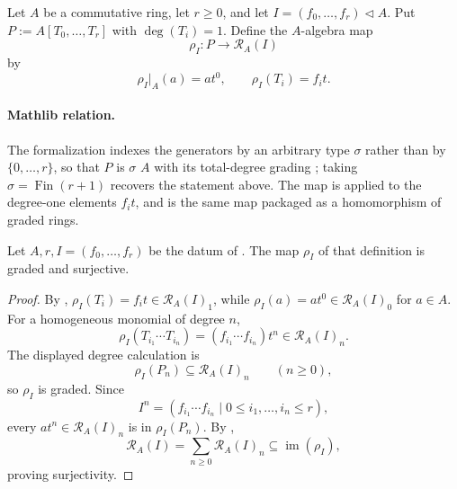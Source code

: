\begin{definition}
  \label{def:nagata-rees-polynomial-map}
  \leanok

  Let $A$ be a commutative ring, let $r\geq0$, and let
  $I=(f_0,\ldots,f_r)\triangleleft A$.  Put
  $P:=A[T_0,\ldots,T_r]$ with
  $\deg(T_i)=1$.  Define the $A$-algebra map
  \[
    \rho_I\colon P\longrightarrow\mathcal R_A(I)
  \]
  by
  \[
    \rho_I|_A(a)=at^0,\qquad \rho_I(T_i)=f_it.
  \]

  \paragraph{Mathlib relation.}
  The formalization indexes the generators by an arbitrary type $\sigma$ rather
  than by $\{0,\ldots,r\}$, so that $P$ is
  \texttt{} $\sigma$ $A$ with its total-degree grading
  \texttt{}; taking
  $\sigma=\operatorname{Fin}(r+1)$ recovers the statement above.  The map is
  \texttt{} applied to the degree-one elements
  $f_it$, and \texttt{} is the same map
  packaged as a homomorphism of graded rings.
\end{definition}

\begin{lemma}
  \label{lemma:nagata-rees-polynomial-surjection}
  \leanok

  Let $A,r,I=(f_0,\ldots,f_r)$ be the datum of
  .  The map $\rho_I$ of that
  definition is graded and surjective.
\end{lemma}

\begin{proof}
  \leanok
  By ,
  $\rho_I(T_i)=f_it\in\mathcal R_A(I)_1$, while
  $\rho_I(a)=at^0\in\mathcal R_A(I)_0$ for $a\in A$.  For a homogeneous
  monomial of degree $n$,
  \[
    \rho_I(T_{i_1}\cdots T_{i_n})
      =(f_{i_1}\cdots f_{i_n})t^n\in\mathcal R_A(I)_n.
  \]
  The displayed degree calculation is
  \[
    \rho_I(P_n)\subseteq\mathcal R_A(I)_n\qquad(n\geq0),
  \]
  so $\rho_I$ is graded.  Since
  \[
    I^n=(f_{i_1}\cdots f_{i_n}\mid
      0\le i_1,\ldots,i_n\le r),
  \]
  every $at^n\in\mathcal R_A(I)_n$ is in $\rho_I(P_n)$.  By
  ,
  \[
    \mathcal R_A(I)=\sum_{n\ge0}\mathcal R_A(I)_n
      \subseteq\operatorname{im}(\rho_I),
  \]
  proving surjectivity.
\end{proof}

